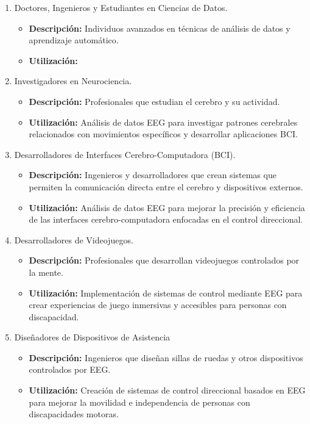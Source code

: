 \begin{enumerate}
\def\labelenumi{\arabic{enumi}.}
\tightlist
\item Doctores, Ingenieros y  Estudiantes en Ciencias de Datos.
  \begin{itemize}
   \tightlist
   \item
    \textbf{Descripción:} Individuos avanzados en técnicas de análisis de datos y aprendizaje automático.
   \item
   \textbf{Utilización:}
   \end{itemize}   
\item Investigadores en Neurociencia.
  \begin{itemize}
   \tightlist
   \item
    \textbf{Descripción:} Profesionales que estudian el cerebro y su actividad.
   \item
   \textbf{Utilización:} Análisis de datos EEG para investigar patrones cerebrales relacionados con movimientos específicos y desarrollar aplicaciones BCI.
   \end{itemize}
 \item Desarrolladores de Interfaces Cerebro-Computadora (BCI).
  \begin{itemize}
   \tightlist
   \item
    \textbf{Descripción:} Ingenieros y desarrolladores que crean sistemas que permiten la comunicación directa entre el cerebro y dispositivos externos.
   \item
   \textbf{Utilización:} Análisis de datos EEG para mejorar la precisión y eficiencia de las interfaces cerebro-computadora enfocadas en el control direccional.
   \end{itemize}  
 \item Desarrolladores de Videojuegos.
  \begin{itemize}
   \tightlist
   \item
    \textbf{Descripción:} Profesionales que desarrollan videojuegos controlados por la mente.
   \item
   \textbf{Utilización:} Implementación de sistemas de control mediante EEG para crear experiencias de juego inmersivas y accesibles para personas con discapacidad.
   \end{itemize}   
 \item Diseñadores de Dispositivos de Asistencia
  \begin{itemize}
   \tightlist
   \item
    \textbf{Descripción:} Ingenieros que diseñan sillas de ruedas y otros dispositivos controlados por EEG.
   \item
   \textbf{Utilización:} Creación de sistemas de control direccional basados en EEG para mejorar la movilidad e independencia de personas con discapacidades motoras.
   \end{itemize}      
\end{enumerate}


